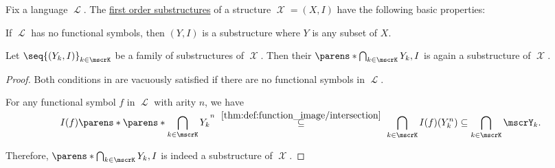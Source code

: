\begin{proposition}\label{thm:def:first_order_substructure}
  Fix a language \( \mscrL \). The \hyperref[def:first_order_substructure]{first order substructures} of a structure \( \mscrX = (X, I) \) have the following basic properties:
  \begin{thmenum}
     If \( \mscrL \) has no functional symbols, then \( (Y, I) \) is a substructure where \( Y \) is any subset of \( X \).

     Let \( \seq{ (Y_k, I) }_{k \in \mscrK} \) be a family of substructures of \( \mscrX \). Then their  \( \parens*{\bigcap_{k \in \mscrK} Y_k, I} \) is again a substructure of \( \mscrX \).
  \end{thmenum}
\end{proposition}
\begin{proof}
   Both conditions in  are vacuously satisfied if there are no functional symbols in \( \mscrL \).

   For any functional symbol \( f \) in \( \mscrL \) with arity \( n \), we have
  \begin{equation*}
    I(f)\parens*{\parens*{\bigcap_{\smash{k \in \mscrK}} Y_k}^n}
    \reloset {\ref{thm:def:function_image/intersection}} \subseteq
    \bigcap_{k \in \mscrK} I(f)(Y_k^n) \subseteq \bigcap_{k \in \mscrK} \mscrY_k.
  \end{equation*}

  Therefore, \( \parens*{\bigcap_{k \in \mscrK} Y_k, I} \) is indeed a substructure of \( \mscrX \).
\end{proof}


